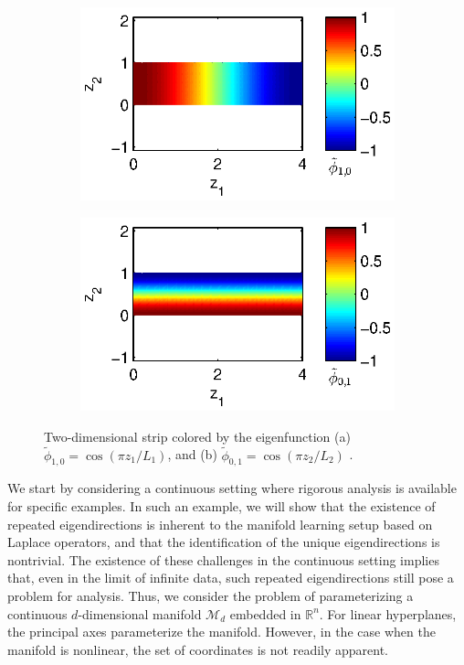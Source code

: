 \documentclass[preprint]{elsarticle}
\begin{document}
\begin{figure}[t]
\centering
\begin{subfigure}{0.45\textwidth}
\includegraphics[width=\textwidth]{strip_cnts1}
\caption{}
\end{subfigure}
%
\begin{subfigure}{0.45\textwidth}
\includegraphics[width=\textwidth]{strip_cnts2}
\caption{}
\end{subfigure}
\caption{Two-dimensional strip colored by the eigenfunction (a) $\tilde{\phi}_{1, 0} = \cos \left( {\pi z_1}/{L_1} \right)$, and (b) $\tilde{\phi}_{0, 1} = \cos \left( {\pi z_2}/{L_2} \right)$ .}
\label{fig:strip_efuncs}
\end{figure}


We start by considering a continuous setting where rigorous analysis is available for specific examples. 
%
In such an example, we will show that the existence of repeated eigendirections is inherent to the manifold learning setup based on Laplace operators, and that the identification of the unique eigendirections is nontrivial. 
%
The existence of these challenges in the continuous setting implies that, even in the limit of infinite data, such repeated eigendirections still pose a problem for analysis. 
%
Thus, we consider the problem of parameterizing a continuous $d$-dimensional manifold $\mathcal{M}_d$ embedded in $\mathbb{R}^n$.
%
For linear hyperplanes, the principal axes parameterize the manifold.
%
However, in the case when the manifold is nonlinear, the set of coordinates is not readily apparent. 
\end{document}
